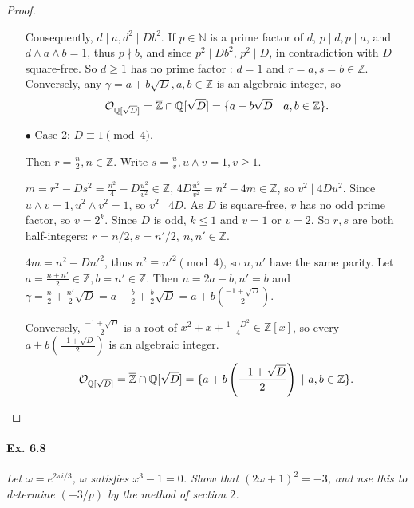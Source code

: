 \documentclass[11pt,a4paper]{article}
\newcommand{\Q}{\mathbb{Q}}
\newcommand{\Z}{\mathbb{Z}}
\newcommand{\N}{\mathbb{N}}
\begin{document}
\begin{proof}
\begin{enumerate}
Consequently, $d\mid a, d^2 \mid Db^2$. If $p\in \N$ is a prime factor of $d$, $p \mid d, p \mid a$, and $d \wedge a \wedge b = 1$, thus $p \nmid b$, and since $p^2 \mid D b^2$, $p^2 \mid D$, in contradiction with $D$ square-free. So $d\geq 1$ has no prime factor : $d = 1$ and $r = a,s = b \in \Z$. Conversely, any $\gamma = a+b\sqrt{D}, a,b \in \Z$ is an algebraic integer, so 
$${\cal O}_{\Q[{\sqrt{D}}]} = \overline{\Z} \cap \Q[{\sqrt{D}}] = \{a + b \sqrt{D}\ \vert \ a,b \in \Z\}.$$

\item[$\bullet$] Case 2: $D \equiv 1 \pmod 4$.

Then $r = \frac{n}{2}, n \in \Z$. Write $s = \frac{u}{v}, u \wedge v = 1, v \geq 1$.

$m = r^2 - D s^2 = \frac{n^2}{4} - D \frac{u^2}{v^2} \in \Z$, $4 D \frac{u^2}{v^2} = n^2 - 4 m \in \Z$, so $v^2 \mid 4 D u^2$. Since $u\wedge v = 1, u^2 \wedge v^2 = 1$, so  $v^2 \mid 4 D$. As $D$ is square-free, $v$ has no odd prime factor, so $v = 2^k$. Since $D$ is odd, $k\leq1$ and $v = 1$ or $v = 2$. So $r,s$ are both half-integers: $r = n/2, s = n'/2,\ n,n' \in \Z$.

$4 m = n^2 - D n'^2$, thus $n^2 \equiv n'^2 \pmod 4$, so $n,n'$ have the same parity. Let $a = \frac{n+n'}{2} \in \Z, b = n' \in \Z$. Then $n = 2a -b, n' = b$ and  $\gamma = \frac{n}{2} + \frac{n'}{2} \sqrt{D} =  a - \frac{b}{2} + \frac{b}{2} \sqrt{D} = a + b\left( \frac{-1+ \sqrt{D}}{2} \right)$.

Conversely, $\frac{-1+ \sqrt{D}}{2}$ is a root of $x^2 + x +\frac{1-D^2}{4} \in \Z[x]$, so every $a + b\left( \frac{-1+ \sqrt{D}}{2} \right)$ is an algebraic integer.
$${\cal O}_{\Q[{\sqrt{D}}]} = \overline{\Z} \cap \Q[{\sqrt{D}}] = \{a + b\left( \frac{-1+ \sqrt{D}}{2} \right)\ \vert \ a,b \in \Z\}.$$
\end{enumerate}
\end{proof}

\paragraph{Ex. 6.8}

{\it Let $\omega = e^{2 \pi i/3}$, $\omega$ satisfies $x^3 - 1 = 0$. Show that $(2 \omega + 1)^2 = -3$, and use this to determine $(-3/p)$ by the method of section $2$.
}
\end{document}
